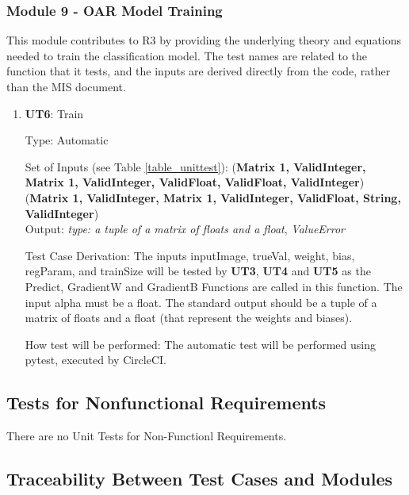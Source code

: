 \documentclass[12pt, titlepage]{article}
\begin{document}
\subsubsection{Module 9 - OAR Model Training}
This module contributes to R3 by providing the underlying theory and equations needed to train the classification model.
The test names are related to the function that it tests, and the inputs are derived directly from the code, rather than the MIS document.

\begin{enumerate}

  \item{\textbf{UT6}: Train}

  Type: Automatic
            
  Set of Inputs (see Table \ref{table_unittest}):   (\textbf{Matrix 1, ValidInteger, Matrix 1, ValidInteger, ValidFloat, ValidFloat, ValidInteger})\\
  (\textbf{Matrix 1, ValidInteger, Matrix 1, ValidInteger, ValidFloat, String, ValidInteger})\\
            
  Output: \textit{type: a tuple of a matrix of floats and a float}, \textit{ValueError}
  
  Test Case Derivation: The inputs inputImage, trueVal, weight, bias, regParam, and trainSize will be tested by \textbf{UT3}, \textbf{UT4} and \textbf{UT5} as the Predict, GradientW and GradientB Functions are called in this function. 
  The input alpha must be a float. The standard output should be a tuple of a matrix of floats and a float (that represent the weights and biases).
  
  How test will be performed: The automatic test will be performed using pytest, executed by CircleCI.

\end{enumerate}

\subsection{Tests for Nonfunctional Requirements}

There are no Unit Tests for Non-Functionl Requirements.

\subsection{Traceability Between Test Cases and Modules}
\end{document}
